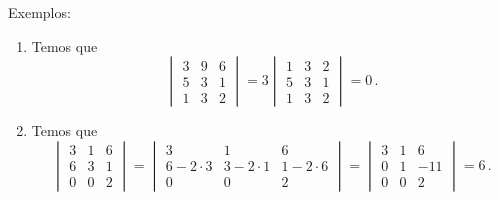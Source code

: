 \documentclass[12pt,a4paper]{report}
\begin{document}
Exemplos:
\begin{enumerate}
  \item Temos que
  $$\begin{vmatrix}
    3&9&6\\
    5&3&1\\
    1&3&2
  \end{vmatrix}=3\begin{vmatrix}
    1&3&2\\
    5&3&1\\
    1&3&2
  \end{vmatrix}=0\,.$$
  \item Temos que
  $$\begin{vmatrix}
    3&1&6\\
    6&3&1\\
    0&0&2
  \end{vmatrix}=\begin{vmatrix}
    3&1&6\\
    6-2\cdot 3&3-2\cdot1&1-2\cdot 6\\
    0&0&2
  \end{vmatrix}=\begin{vmatrix}
    3&1&6\\
    0&1&-11\\
    0&0&2
  \end{vmatrix}=6\,.$$
\end{enumerate}
\end{document}
